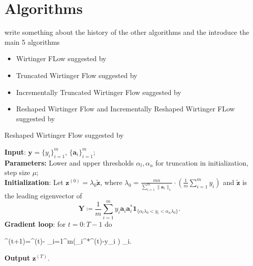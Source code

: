 \chapter{Algorithms}

write something about the history of the other algorithms and the introduce the main 5 algorithms

\begin{itemize}
\item  Wirtinger FLow suggested by \cite{Candes_2015}
\item Truncated Wirtinger Flow suggested by \cite{chen2016solving}
\item Incrementally Truncated Wirtinger Flow suggested by \cite{kolte2016phase}
\item Reshaped Wirtinger Flow and Incrementally Reshaped Wirtinger FLow suggested by \cite{zhang2016reshaped}

\end{itemize}



















	\begin{algorithm}
	\caption{Reshaped Wirtinger Flow suggested by \cite{zhang2016reshaped}}\label{alg:rwf}
		\textbf{Input}: $\boldsymbol{y}=\{y_i\}_{i=1}^m$, $\{\boldsymbol{a}_i\}_{i=1}^m$; \\
		\textbf{Parameters:}  Lower and upper thresholds $\alpha_l,\alpha_u$ for  truncation in initialization, step size $\mu$;\\
		\textbf{Initialization}: Let $\boldsymbol{z}^{(0)}=\lambda_0 \tilde{\boldsymbol{z}}$, where $\lambda_0=\frac{mn}{\sum_{i=1}^m \|\boldsymbol{a}_i\|_1}\cdot \left(\frac{1}{m}\sum_{i=1}^m y_i\right)$ and $\tilde{\boldsymbol{z}}$ is the leading eigenvector of
		\begin{equation}\label{eq:init_TRWF}
			\boldsymbol{Y} \coloneqq \frac{1}{m}\sum_{i=1}^m y_i\boldsymbol{a}_i \boldsymbol{a}_i^*\boldsymbol{1}_{\{\alpha_l \lambda_0<y_i< \alpha_u \lambda_0\}}.
		\end{equation}
		\textbf{Gradient loop}: for $t=0:T-1$ do
		\begin{flalign}\label{eq:loop_FWF}
			^{(t+1)}=^{(t)}- \sum_{i=1}^{m}\left(_i^*^{(t)}-y_i\cdot{} \right) _i.
		\end{flalign}
		\textbf{Output} $\boldsymbol{z}^{(T)}$.
	\end{algorithm}


